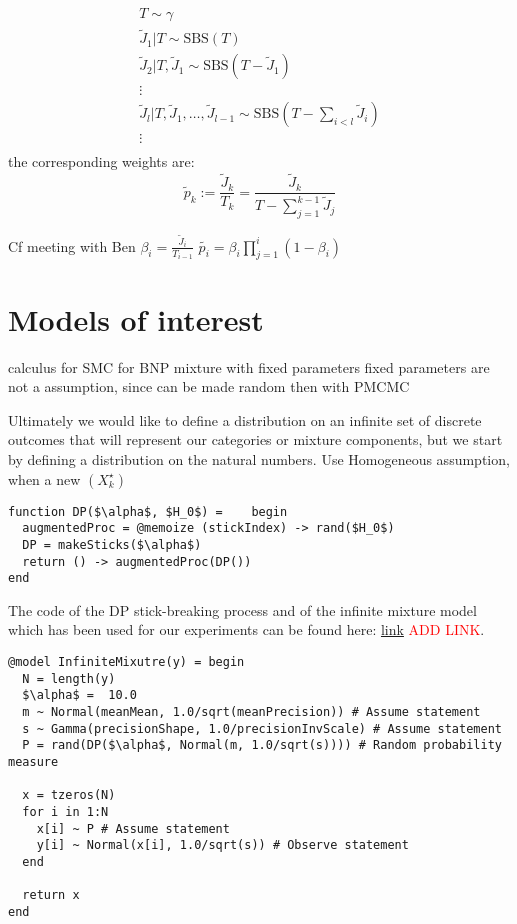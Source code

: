\begin{gather*}
T \sim \gamma \\
\tilde{J}_1|T \sim \text{SBS}(T) \\
\tilde{J}_2|T,\tilde{J}_1 \sim \text{SBS}(T - \tilde{J}_1) \\
\vdots \\
\tilde{J}_{l}|T,\tilde{J}_1,\dots,\tilde{J}_{l-1} \sim \text{SBS}(T - \sum_{i<l} \tilde{J}_i) \\
\vdots \\
\end{gather*}
the corresponding weights are:
$$ \tilde{p}_k := \frac{\tilde{J}_{k}}{T_k} = \frac{\tilde{J}_{k}}{T - \sum_{j=1}^{k-1} \tilde{J}_j} $$


Cf meeting with Ben
$\beta_i = \frac{\tilde{J}_i}{T_{i-1}}$
$\tilde{p_i} = \beta_i \prod_{j=1}^i (1-\beta_i)$


\section{Models of interest}
calculus for SMC for BNP mixture with fixed parameters
fixed parameters are not a assumption, since can be made random then with PMCMC


Ultimately we would like to define a distribution on an infinite set of discrete outcomes that will represent our categories or mixture components, but we start by defining a distribution on the natural numbers.
Use Homogeneous assumption, when a new $(X_k^\star)$

\begin{lstlisting}[caption={\acrlong{DP} written in Julia.},captionpos=b,label=code:DP]
function DP($\alpha$, $H_0$) =    begin
  augmentedProc = @memoize (stickIndex) -> rand($H_0$)
  DP = makeSticks($\alpha$)
  return () -> augmentedProc(DP())
end
\end{lstlisting}


The code of the \gls{DP} stick-breaking process and of the infinite mixture model which has been used for our experiments can be found here: \url{link} \textcolor{red}{ADD LINK}.

\begin{lstlisting}[caption={Nonconjugate infinite mixture model written in Turing.jl.},captionpos=b,label=code:IMM]
@model InfiniteMixutre(y) = begin
  N = length(y)
  $\alpha$ =  10.0
  m ~ Normal(meanMean, 1.0/sqrt(meanPrecision)) # Assume statement
  s ~ Gamma(precisionShape, 1.0/precisionInvScale) # Assume statement
  P = rand(DP($\alpha$, Normal(m, 1.0/sqrt(s)))) # Random probability measure

  x = tzeros(N)
  for i in 1:N
    x[i] ~ P # Assume statement
    y[i] ~ Normal(x[i], 1.0/sqrt(s)) # Observe statement
  end

  return x
end
\end{lstlisting}

